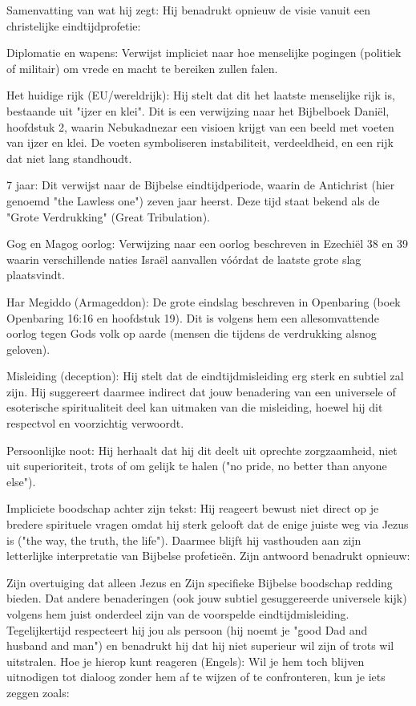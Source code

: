 Samenvatting van wat hij zegt:
Hij benadrukt opnieuw de visie vanuit een christelijke eindtijdprofetie:

Diplomatie en wapens: Verwijst impliciet naar hoe menselijke pogingen (politiek of militair) om vrede en macht te bereiken zullen falen.

Het huidige rijk (EU/wereldrijk): Hij stelt dat dit het laatste menselijke rijk is, bestaande uit "ijzer en klei". Dit is een verwijzing naar het Bijbelboek Daniël, hoofdstuk 2, waarin Nebukadnezar een visioen krijgt van een beeld met voeten van ijzer en klei. De voeten symboliseren instabiliteit, verdeeldheid, en een rijk dat niet lang standhoudt.

7 jaar: Dit verwijst naar de Bijbelse eindtijdperiode, waarin de Antichrist (hier genoemd "the Lawless one") zeven jaar heerst. Deze tijd staat bekend als de "Grote Verdrukking" (Great Tribulation).

Gog en Magog oorlog: Verwijzing naar een oorlog beschreven in Ezechiël 38 en 39 waarin verschillende naties Israël aanvallen vóórdat de laatste grote slag plaatsvindt.

Har Megiddo (Armageddon): De grote eindslag beschreven in Openbaring (boek Openbaring 16:16 en hoofdstuk 19). Dit is volgens hem een allesomvattende oorlog tegen Gods volk op aarde (mensen die tijdens de verdrukking alsnog geloven).

Misleiding (deception): Hij stelt dat de eindtijdmisleiding erg sterk en subtiel zal zijn. Hij suggereert daarmee indirect dat jouw benadering van een universele of esoterische spiritualiteit deel kan uitmaken van die misleiding, hoewel hij dit respectvol en voorzichtig verwoordt.

Persoonlijke noot: Hij herhaalt dat hij dit deelt uit oprechte zorgzaamheid, niet uit superioriteit, trots of om gelijk te halen ("no pride, no better than anyone else").

Impliciete boodschap achter zijn tekst:
Hij reageert bewust niet direct op je bredere spirituele vragen omdat hij sterk gelooft dat de enige juiste weg via Jezus is ("the way, the truth, the life"). Daarmee blijft hij vasthouden aan zijn letterlijke interpretatie van Bijbelse profetieën. Zijn antwoord benadrukt opnieuw:

Zijn overtuiging dat alleen Jezus en Zijn specifieke Bijbelse boodschap redding bieden.
Dat andere benaderingen (ook jouw subtiel gesuggereerde universele kijk) volgens hem juist onderdeel zijn van de voorspelde eindtijdmisleiding.
Tegelijkertijd respecteert hij jou als persoon (hij noemt je "good Dad and husband and man") en benadrukt hij dat hij niet superieur wil zijn of trots wil uitstralen.
Hoe je hierop kunt reageren (Engels):
Wil je hem toch blijven uitnodigen tot dialoog zonder hem af te wijzen of te confronteren, kun je iets zeggen zoals:

